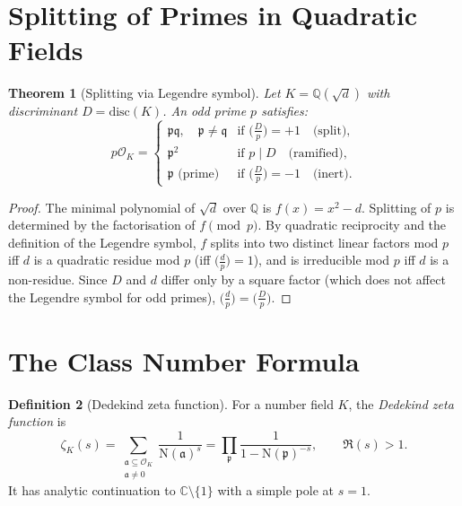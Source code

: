 \documentclass[12pt,a4paper]{amsart}
\newtheorem{theorem}{Theorem}[section]
\theoremstyle{definition}
\newtheorem{definition}[theorem]{Definition}
\newcommand{\Q}{\mathbb{Q}}
\newcommand{\C}{\mathbb{C}}
\newcommand{\OK}{\mathcal{O}_K}
\newcommand{\p}{\mathfrak{p}}
\newcommand{\q}{\mathfrak{q}}
\newcommand{\aaa}{\mathfrak{a}}
\newcommand{\Nm}{\mathrm{N}}
\newcommand{\disc}{\mathrm{disc}}
\begin{document}
\section{Splitting of Primes in Quadratic Fields}

\begin{theorem}[Splitting via Legendre symbol]
\label{thm:quad_split}
Let $K = \Q(\sqrt{d})$ with discriminant $D = \disc(K)$.  An odd prime $p$
satisfies:
\[
  p\OK =
  \begin{cases}
    \p\q, \quad \p \ne \q & \text{if } \bigl(\tfrac{D}{p}\bigr) = +1
    \quad\text{(split)}, \\[2pt]
    \p^2 & \text{if } p \mid D
    \quad\text{(ramified)}, \\[2pt]
    \p \text{ (prime)} & \text{if } \bigl(\tfrac{D}{p}\bigr) = -1
    \quad\text{(inert)}.
  \end{cases}
\]
\end{theorem}

\begin{proof}
The minimal polynomial of $\sqrt{d}$ over $\Q$ is $f(x) = x^2 - d$.
Splitting of $p$ is determined by the factorisation of $f \pmod{p}$.
By quadratic reciprocity and the definition of the Legendre symbol,
$f$ splits into two distinct linear factors mod $p$ iff $d$ is a quadratic
residue mod $p$ (iff $\bigl(\tfrac{d}{p}\bigr) = 1$), and is irreducible
mod $p$ iff $d$ is a non-residue.  Since $D$ and $d$ differ only by a
square factor (which does not affect the Legendre symbol for odd primes),
$\bigl(\tfrac{d}{p}\bigr) = \bigl(\tfrac{D}{p}\bigr)$.
\end{proof}

\section{The Class Number Formula}

\begin{definition}[Dedekind zeta function]
\label{def:dedekind_zeta}
For a number field $K$, the \emph{Dedekind zeta function} is
\[
  \zeta_K(s) = \sum_{\substack{\aaa \subseteq \OK \\ \aaa \ne 0}} \frac{1}{\Nm(\aaa)^s}
  = \prod_{\p} \frac{1}{1 - \Nm(\p)^{-s}}, \qquad \Re(s) > 1.
\]
It has analytic continuation to $\C \setminus \{1\}$ with a simple pole at $s=1$.
\end{definition}
\end{document}
